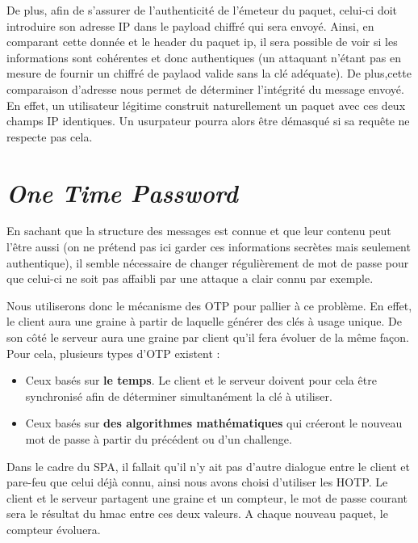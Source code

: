 De plus, afin de s'assurer de l'authenticité de l'émeteur du paquet, celui-ci doit introduire son adresse IP dans le payload chiffré qui sera envoyé. Ainsi, en comparant cette donnée et le header du paquet ip, il sera possible de voir si les informations sont cohérentes et donc authentiques (un attaquant n'étant pas en mesure de fournir un chiffré de paylaod valide sans la clé adéquate). 
De plus,cette comparaison d'adresse nous permet de déterminer l'intégrité du message envoyé.
En effet, un utilisateur légitime construit naturellement un paquet avec ces deux champs IP identiques. Un usurpateur pourra alors être démasqué si sa requête ne respecte pas cela.

\section{\emph{\textbf{O}ne \textbf{T}ime \textbf{P}assword}}
En sachant que la structure des messages est connue et que leur contenu peut l'être aussi (on ne prétend pas ici garder ces informations secrètes mais seulement authentique), il semble nécessaire de changer régulièrement de mot de passe pour que celui-ci ne soit pas affaibli par une attaque a clair connu par exemple.

Nous utiliserons donc le mécanisme des OTP pour pallier à ce problème. En effet, le client aura une graine à partir de laquelle générer des clés à usage unique. De son côté le serveur aura une graine par client qu'il fera évoluer de la même façon.
\\
Pour cela, plusieurs types d'OTP existent :
\begin{itemize}
\item Ceux basés sur \textbf{le temps}. Le client et le serveur doivent pour cela être synchronisé afin de déterminer simultanément la clé à utiliser.  
\item Ceux basés sur \textbf{des algorithmes mathématiques} qui créeront le nouveau mot de passe à partir du précédent ou d'un challenge.
\end{itemize}
Dans le cadre du SPA, il fallait qu'il n'y ait pas d'autre dialogue entre le client et pare-feu que celui déjà connu, ainsi nous avons choisi d'utiliser les HOTP. Le client et le serveur partagent une graine et un compteur, le mot de passe courant sera le résultat du hmac entre ces deux valeurs. A chaque nouveau paquet, le compteur évoluera.
